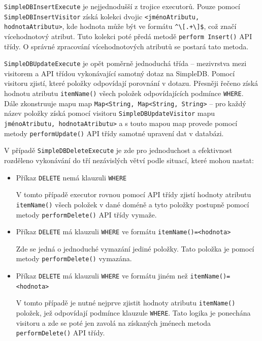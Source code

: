 \documentclass[oneside,12pt,final]{fithesis2}
\begin{document}
\texttt{SimpleDBInsertExecute} je nejjednodušší z trojice executorů. Pouze pomocí \texttt{SimpleDBInsertVisitor} získá kolekci dvojic \texttt{<jménoAtributu, hodnota\allowbreak Atributu>}, kde hodnota může být ve formátu \verb|^\[.+\]$|, což značí vícehodnotový atribut. Tuto kolekci poté předá metodě \texttt{perform Insert()} API třídy. O správné zpracování vícehodnotových atributů se postará tato metoda.

\texttt{SimpleDBUpdateExecute} je opět poměrně jednoduchá třída -- mezivrstva mezi visitorem a API třídou vykonávající samotný dotaz na SimpleDB. Pomocí visitoru zjistí, které položky odpovídají porovnání v dotazu. Přesněji řečeno získá hodnotu atributu \texttt{itemName()} všech položek odpovídajících podmínce \texttt{WHERE}. Dále zkonstruuje mapu map \texttt{Map<String, Map<String, String>} -- pro každý název položky získá pomocí visitoru \texttt{SimpleDBUpdate\allowbreak Visitor} mapu \texttt{jménoAtributu, hodnotaAtributu>} a s touto mapou map provede pomocí metody \texttt{performUpdate()} API třídy samotné upravení dat v databázi.

V případě \texttt{SimpleDBDeleteExecute} je zde pro jednoduchost a efektivnost rozděleno vykonávání do tří nezávislých větví podle situací, které mohou nastat:
\begin{itemize}
 \item Příkaz \texttt{DELETE} nemá klauzuli \texttt{WHERE}
 
  V tomto případě executor rovnou pomocí API třídy zjistí hodnoty atributu \texttt{itemName()} všech položek v dané doméně a tyto položky postupně pomocí metody \texttt{performDelete()} API třídy vymaže.
  
  \item Příkaz \texttt{DELETE} má klauzuli \texttt{WHERE} ve formátu \texttt{itemName()=<hodnota>}
  
  Zde se jedná o jednoduché vymazání jediné položky. Tato položka je pomocí metody \texttt{performDelete()} vymazána.
  
  \item Příkaz \texttt{DELETE} má klauzuli \texttt{WHERE} ve formátu jiném než \texttt{itemName()= <hodnota>}
  
  V tomto případě je nutné nejprve zjistit hodnoty atributu \texttt{itemName()} položek, jež odpovídají podmínce klauzule \texttt{WHERE}. Tato logika je ponechána visitoru a zde se poté jen zavolá na získaných jménech metoda \texttt{performDelete()} API třídy.
\end{itemize}
\end{document}
